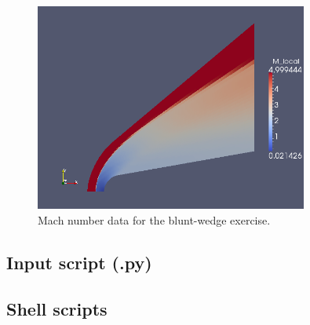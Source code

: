 \begin{figure}[htbp]
\begin{center}
\includegraphics[width=0.8\textwidth]{../2D/blunt-wedge/bw-Mach-field.png}
\end{center}
\caption{Mach number data for the blunt-wedge exercise.}
\label{bw-Mach-fig}
\end{figure}

\newpage

\subsection{Input script (.py)}
\topbar

\bottombar

\newpage
\subsection{Shell scripts}
\label{bw-sh-files}
\topbar

\bottombar

\noindent
\topbar

\bottombar

\noindent
\topbar

\bottombar

\newpage
